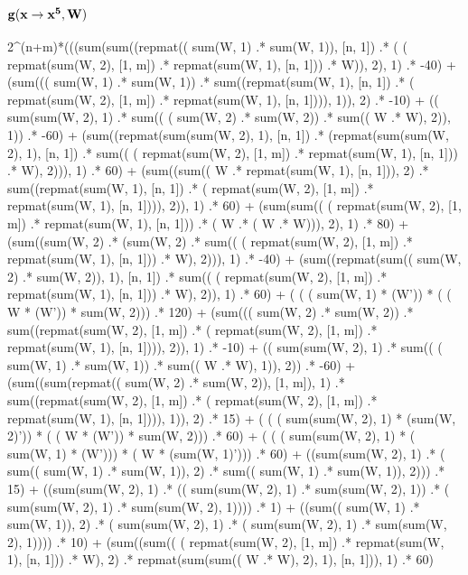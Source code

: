 \documentclass[]{article}
\begin{document}
\subsection{{$\bf g(x \rightarrow x^5, W)$}}
            2\^{}(n+m)*(((sum(sum((repmat(( sum(W, 1) .* sum(W, 1)), [n, 1])  .* ( ( repmat(sum(W, 2), [1, m]) .* repmat(sum(W, 1), [n, 1])) .* W)), 2), 1)  .* -40)  
              + (sum((( sum(W, 1) .* sum(W, 1))  .* sum((repmat(sum(W, 1), [n, 1])  .* ( repmat(sum(W, 2), [1, m]) .* repmat(sum(W, 1), [n, 1]))), 1)), 2)  .* -10)  
              + (( sum(sum(W, 2), 1) .* sum(( ( sum(W, 2) .* sum(W, 2)) .* sum(( W .* W), 2)), 1))  .* -60)  
              + (sum((repmat(sum(sum(W, 2), 1), [n, 1])  .* (repmat(sum(sum(W, 2), 1), [n, 1])  .* sum(( ( repmat(sum(W, 2), [1, m]) .* repmat(sum(W, 1), [n, 1])) .* W), 2))), 1)  .* 60)  
              + (sum((sum(( W .* repmat(sum(W, 1), [n, 1])), 2)  .* sum((repmat(sum(W, 1), [n, 1])  .* ( repmat(sum(W, 2), [1, m]) .* repmat(sum(W, 1), [n, 1]))), 2)), 1)  .* 60)  
              + (sum(sum(( ( repmat(sum(W, 2), [1, m]) .* repmat(sum(W, 1), [n, 1])) .* ( W .* ( W .* W))), 2), 1)  .* 80)  
              + (sum((sum(W, 2)  .* (sum(W, 2)  .* sum(( ( repmat(sum(W, 2), [1, m]) .* repmat(sum(W, 1), [n, 1])) .* W), 2))), 1)  .* -40)  
              + (sum((repmat(sum(( sum(W, 2) .* sum(W, 2)), 1), [n, 1])  .* sum(( ( repmat(sum(W, 2), [1, m]) .* repmat(sum(W, 1), [n, 1])) .* W), 2)), 1)  .* 60)  
              + ( ( ( sum(W, 1) * (W')) * ( ( W * (W')) * sum(W, 2))) .* 120)  
              + (sum((( sum(W, 2) .* sum(W, 2))  .* sum((repmat(sum(W, 2), [1, m])  .* ( repmat(sum(W, 2), [1, m]) .* repmat(sum(W, 1), [n, 1]))), 2)), 1)  .* -10)  
              + (( sum(sum(W, 2), 1) .* sum(( ( sum(W, 1) .* sum(W, 1)) .* sum(( W .* W), 1)), 2))  .* -60)  
              + (sum((sum(repmat(( sum(W, 2) .* sum(W, 2)), [1, m]), 1)  .* sum((repmat(sum(W, 2), [1, m])  .* ( repmat(sum(W, 2), [1, m]) .* repmat(sum(W, 1), [n, 1]))), 1)), 2)  .* 15)  
              + ( ( ( sum(sum(W, 2), 1) * (sum(W, 2)')) * ( ( W * (W')) * sum(W, 2))) .* 60)  
              + ( ( ( sum(sum(W, 2), 1) * ( sum(W, 1) * (W'))) * ( W * (sum(W, 1)'))) .* 60)  
              + ((sum(sum(W, 2), 1)  .* ( sum(( sum(W, 1) .* sum(W, 1)), 2) .* sum(( sum(W, 1) .* sum(W, 1)), 2)))  .* 15)  
              + ((sum(sum(W, 2), 1)  .* (( sum(sum(W, 2), 1) .* sum(sum(W, 2), 1))  .* ( sum(sum(W, 2), 1) .* sum(sum(W, 2), 1))))  .* 1)  
              + ((sum(( sum(W, 1) .* sum(W, 1)), 2)  .* ( sum(sum(W, 2), 1) .* ( sum(sum(W, 2), 1) .* sum(sum(W, 2), 1))))  .* 10)  
              + (sum((sum(( ( repmat(sum(W, 2), [1, m]) .* repmat(sum(W, 1), [n, 1])) .* W), 2)  .* repmat(sum(sum(( W .* W), 2), 1), [n, 1])), 1)  .* 60)  
\end{document}
